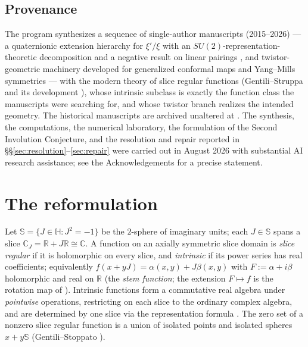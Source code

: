 \documentclass[11pt]{amsart}
\theoremstyle{plain}
\theoremstyle{definition}
\theoremstyle{remark}
\newcommand{\HH}{\mathbb{H}}
\newcommand{\CC}{\mathbb{C}}
\newcommand{\RR}{\mathbb{R}}
\renewcommand{\SS}{\mathbb{S}}
\begin{document}
\subsection*{Provenance}
The program synthesizes a sequence of single-author manuscripts (2015--2026) --- a quaternionic
extension hierarchy for $\xi'/\xi$ with an $SU(2)$-representation-theoretic decomposition and a
negative result on linear pairings \cite{Baker2015,Baker2016}, and twistor-geometric machinery
developed for generalized conformal maps and Yang--Mills symmetries
\cite{Baker2017,Baker2022arXiv,Baker2023arXiv} --- with the modern theory of slice regular
functions (Gentili--Struppa \cite{GentiliStruppa2007} and its development
\cite{GentiliStoppato2008,CGSS2009,GSSbook,GhiloniPerotti2011}), whose intrinsic subclass is
exactly the function class the manuscripts were searching for, and whose twistor branch
\cite{GSS2014,Altavilla2018,AltavillaSarfatti2019} realizes the intended geometry. The historical
manuscripts are archived unaltered at \cite{ZenodoArchive}. The synthesis, the computations, the
numerical laboratory, the formulation of the Second Involution Conjecture, and the resolution and
repair reported in \S\S\ref{sec:resolution}--\ref{sec:repair} were carried out in August 2026 with
substantial AI research assistance; see the Acknowledgements for a precise statement.

\section{The reformulation}\label{sec:reformulation}

Let $\SS=\{J\in\HH:J^2=-1\}$ be the $2$-sphere of imaginary units; each $J\in\SS$ spans a slice
$\CC_J=\RR+J\RR\cong\CC$. A function on an axially symmetric slice domain is \emph{slice regular}
\cite{GentiliStruppa2007} if it is holomorphic on every slice, and \emph{intrinsic} if its power
series has real coefficients; equivalently $f(x+yJ)=\alpha(x,y)+J\beta(x,y)$ with
$F:=\alpha+i\beta$ holomorphic and real on $\RR$ (the \emph{stem function}; the extension
$F\mapsto f$ is the rotation map of \cite[eq.~(2.5)]{Baker2015}). Intrinsic functions form a
commutative real algebra under \emph{pointwise} operations, restricting on each slice to the
ordinary complex algebra, and are determined by one slice via the representation formula
\cite{CGSS2009,GSSbook}. The zero set of a nonzero slice regular function is a union of isolated
points and isolated spheres $x+y\SS$ (Gentili--Stoppato \cite{GentiliStoppato2008}).
\end{document}
